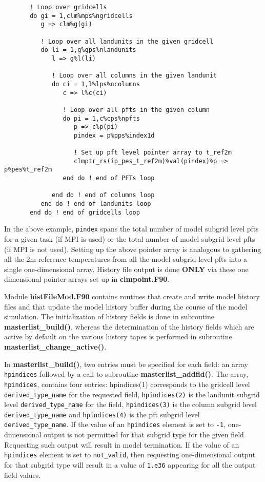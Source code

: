\begin{verbatim}
       ! Loop over gridcells
       do gi = 1,clm%mps%ngridcells
          g => clm%g(gi)
     
          ! Loop over all landunits in the given gridcell
          do li = 1,g%gps%nlandunits
             l => g%l(li)
     
             ! Loop over all columns in the given landunit
             do ci = 1,l%lps%ncolumns
                c => l%c(ci)
     
                ! Loop over all pfts in the given column
                do pi = 1,c%cps%npfts
                   p => c%p(pi)
                   pindex = p%pps%index1d
     
                   ! Set up pft level pointer array to t_ref2m
                   clmptr_rs(ip_pes_t_ref2m)%val(pindex)%p => p%pes%t_ref2m
                end do ! end of PFTs loop

             end do ! end of columns loop
          end do ! end of landunits loop
       end do ! end of gridcells loop
\end{verbatim}

In the above example, {\tt pindex} spans the total number of model
subgrid level pfts for a given task (if MPI is used) or the total
number of model subgrid level pfts (if MPI is not used).  Setting up
the above pointer array is analogous to gathering all the 2m reference
temperatures from all the model subgrid level pfts into a single
one-dimensional array.  History file output is done {\bf ONLY} via
these one dimensional pointer arrays set up in {\bf clmpoint.F90}.

Module {\bf histFileMod.F90} contains routines that create and write
model history files and that update the model history buffer during
the course of the model simulation.  The initialization of history
fields is done in subroutine {\bf masterlist\_build()}, whereas the
determination of the history fields which are active by default on the
various history tapes is performed in subroutine {\bf
masterlist\_change\_active()}.

In {\bf masterlist\_build()}, two entries must be specified for each
field: an array {\tt hpindices} followed by a call to subroutine {\bf
masterlist\_addfld()}. The array, {\tt hpindices}, contains four
entries: hpindices(1) corresponds to the gridcell level {\tt
derived\_type\_name} for the requested field, {\tt hpindices(2)} is
the landunit subgrid level {\tt derived\_type\_name} for the field,
{\tt hpindices(3)} is the column subgrid level {\tt
derived\_type\_name} and {\tt hpindices(4)} is the pft subgrid level
{\tt derived\_type\_name}.  If the value of an {\tt hpindices} element
is set to {\tt -1}, one-dimensional output is not permitted for that
subgrid type for the given field. Requesting such output will result
in model termination.  If the value of an {\tt hpindices} element is
set to {\tt not\_valid}, then requesting one-dimensional output for
that subgrid type will result in a value of {\tt 1.e36} appearing for
all the output field values. 

